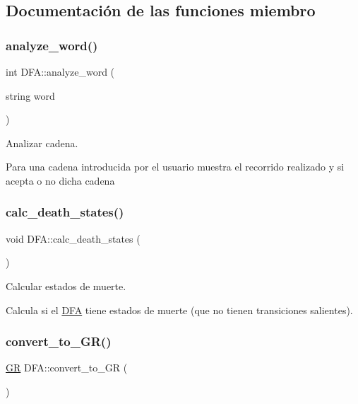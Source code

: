 \subsection{Documentación de las funciones miembro}
\mbox{\label{class_d_f_a_a227c0b51b2f512efe3dad555438dcb87}} 
\subsubsection{\texorpdfstring{analyze\+\_\+word()}{analyze\_word()}}
{\footnotesize\ttfamily int D\+F\+A\+::analyze\+\_\+word (\begin{DoxyParamCaption}\item[{string}]{word }\end{DoxyParamCaption})}



Analizar cadena. 

Para una cadena introducida por el usuario muestra el recorrido realizado y si acepta o no dicha cadena \mbox{\label{class_d_f_a_a33120a3dd98a3bf89f090b98340aa644}} 
\subsubsection{\texorpdfstring{calc\+\_\+death\+\_\+states()}{calc\_death\_states()}}
{\footnotesize\ttfamily void D\+F\+A\+::calc\+\_\+death\+\_\+states (\begin{DoxyParamCaption}{ }\end{DoxyParamCaption})}



Calcular estados de muerte. 

Calcula si el \mbox{\hyperlink{class_d_f_a}{D\+FA}} tiene estados de muerte (que no tienen transiciones salientes). \mbox{\label{class_d_f_a_a1e6d75070c094116a6d54f9ed61770e4}} 
\subsubsection{\texorpdfstring{convert\+\_\+to\+\_\+\+G\+R()}{convert\_to\_GR()}}
{\footnotesize\ttfamily \mbox{\hyperlink{class_g_r}{GR}} D\+F\+A\+::convert\+\_\+to\+\_\+\+GR (\begin{DoxyParamCaption}{ }\end{DoxyParamCaption})}



